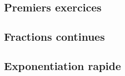 

\usepackage{parcolumns}
\setlength{\parindent}{0pt}

 

\subsection{Premiers exercices}


\subsection{Fractions continues}


\subsection{Exponentiation rapide}


